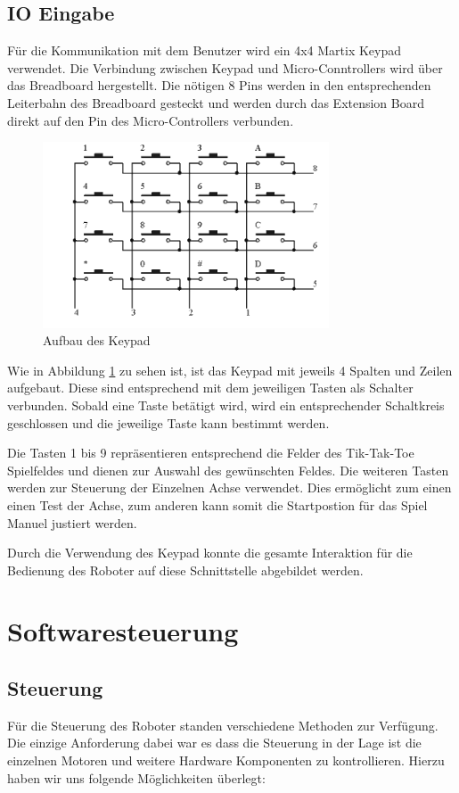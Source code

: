 \documentclass[conference,compsoc,final,a4paper]{IEEEtran}
\begin{document}
\subsection{IO Eingabe}

Für die Kommunikation mit dem Benutzer wird ein 4x4 Martix Keypad verwendet. Die Verbindung zwischen Keypad und Micro-Conntrollers wird über das Breadboard hergestellt. 
Die nötigen 8 Pins werden in den entsprechenden Leiterbahn des Breadboard gesteckt und werden durch das Extension Board  direkt auf den Pin des Micro-Controllers verbunden.

\begin{figure}[h]
\includegraphics[width=8.5cm]{../images/keypad.png}
\caption{Aufbau des Keypad \autocite{freenoveTutorial}}\label{Elektrik:Keypad}
\end{figure}

Wie in Abbildung \ref{Elektrik:Keypad} zu sehen ist, ist das Keypad mit jeweils 4 Spalten und Zeilen aufgebaut. Diese sind entsprechend mit dem jeweiligen Tasten als Schalter verbunden. 
Sobald eine Taste betätigt wird, wird ein entsprechender Schaltkreis geschlossen und die jeweilige Taste kann bestimmt werden.

Die Tasten 1 bis 9 repräsentieren entsprechend die Felder des Tik-Tak-Toe Spielfeldes und dienen zur Auswahl des gewünschten Feldes. 
Die weiteren Tasten werden zur Steuerung der Einzelnen Achse verwendet.
Dies ermöglicht zum einen einen Test der Achse, zum anderen kann somit die Startpostion für das Spiel Manuel justiert werden.

Durch die Verwendung des Keypad konnte die gesamte Interaktion für die Bedienung des Roboter auf diese Schnittstelle abgebildet werden.

\section{Softwaresteuerung}

\subsection{Steuerung}
Für die Steuerung des Roboter standen verschiedene Methoden zur Verfügung. Die einzige Anforderung dabei
war es dass die Steuerung in der Lage ist die einzelnen Motoren und weitere Hardware Komponenten
zu kontrollieren. Hierzu haben wir uns folgende Möglichkeiten überlegt:
\end{document}
